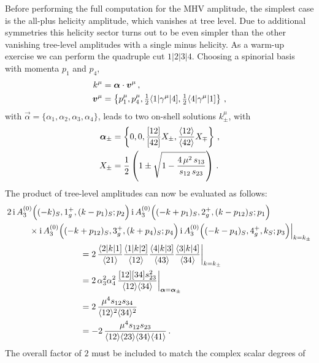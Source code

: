 Before performing the full computation for the MHV amplitude, the simplest case
is the all-plus helicity amplitude, which vanishes at tree level. Due to
additional symmetries this helicity sector turns out to be even simpler than
the other vanishing tree-level amplitudes with a single minus helicity. As a
warm-up exercise we can perform the quadruple cut $1|2|3|4$. Choosing a spinorial basis with momenta $p_1$ and $p_4$,
\begin{align}
  k^\mu &= \vec{\alpha} \cdot \vec{v}^\mu \,, \\
  \vec{v}^\mu &= \left\{p_1^\mu, p_4^\mu, \tfrac{1}{2}\spAB1{\gamma^\mu}4, \tfrac{1}{2}\spAB4{\gamma^\mu}1\right\} \,,
\end{align}
with $\vec{\alpha}=\{\alpha_1,\alpha_2,\alpha_3,\alpha_4\}$, leads to two on-shell solutions $k_{\pm}^{\mu}$, with 
\begin{align}
  \vec{\alpha}_{\pm} &= \left\{0, 0,  \frac{\spB12}{\spB42} X_\pm,  \frac{\spA12}{\spA42} X_\mp \right\} \,, \\
  X_\pm & = \frac{1}{2}\left( 1 \pm \sqrt{1-\frac{4 \, \mu^2 \, s_{13}}{s_{12} \, s_{23}}}\right) \,.
\end{align}
The product of tree-level amplitudes can now be evaluated as follows:
\begin{align}
  & 2 \, \i \, A^{(0)}_3\Bigl((-k)_S, 1^+_g, (k-p_1)_S; p_2\Bigr) \, \i \, A^{(0)}_3\Bigl((-k+p_1)_S, 2^+_g, (k-p_{12})_S; p_1\Bigr) \nonumber\\
  & \hspace{0.9cm} \times \i \, A^{(0)}_3\Bigl((-k+p_{12})_S, 3^+_g, (k+p_4)_S; p_4\Bigr) \, \i \, A^{(0)}_3\Bigl((-k-p_4)_S, 4^+_g, k_S; p_3\Bigr) \Bigl|_{k=k_{\pm}} \nonumber\\
  &\hspace{3cm} = 2 \, \frac{\spAB2k1}{\spA21} \frac{\spAB1k2}{\spA12} \frac{\spAB4k3}{\spA43} \frac{\spAB3k4}{\spA34} \biggl|_{k=k_{\pm}} \nonumber\\
  &\hspace{3cm} = 2 \, \alpha_3^2 \alpha_4^2 \, \frac{\spB12\spB34 s_{23}^2}{\spA12\spA34} \biggl|_{\vec{\alpha}=\vec{\alpha}_{\pm}} \nonumber\\
  &\hspace{3cm} = 2 \, \frac{\mu^4 s_{12} s_{34}}{\spA12^2 \spA34^2}\nonumber\\
  &\hspace{3cm} = -2 \, \frac{\mu^4 s_{12} s_{23}}{\spA12\spA23\spA34\spA41} \,.
\end{align}
The overall factor of $2$ must be included to match the complex scalar degrees of
